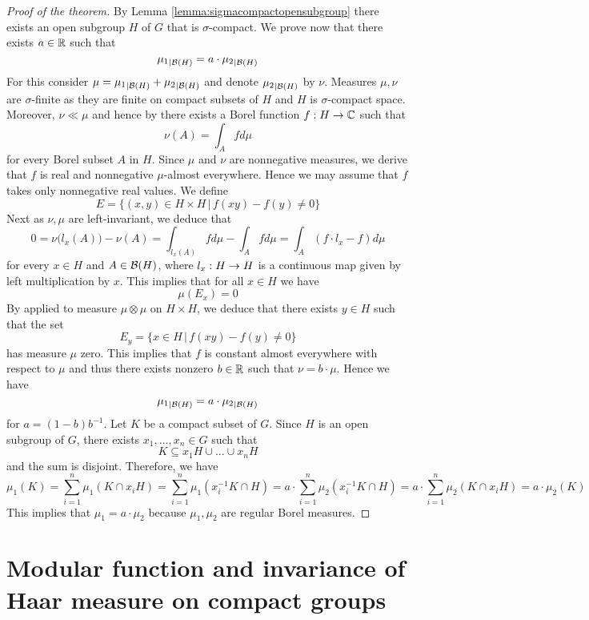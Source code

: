 \begin{proof}[Proof of the theorem]
By Lemma \ref{lemma:sigmacompactopensubgroup} there exists an open subgroup $H$ of $G$ that is $\sigma$-compact. We prove now that there exists $a\in {\mathbb R}$ such that
$${\mu_1}_{\mid {\mathcal B}(H)} = a\cdot {\mu_2}_{\mid {\mathcal B}(H)}$$
For this consider $\mu = {\mu_1}_{\mid {\mathcal B}(H)} + {\mu_2}_{\mid {\mathcal B}(H)}$ and denote ${\mu_2}_{\mid {\mathcal B}(H)}$ by $\nu$. Measures $\mu, \nu$ are $\sigma$-finite as they are finite on compact subsets of $H$ and $H$ is $\sigma$-compact space. Moreover, $\nu \ll \mu$ and hence by {\cite[Theorem 5.3]{Radon_Nikodym_Hahn_Jordan_Lebesgue_decomposition}} there exists a Borel function $f:H\rightarrow {\mathbb C}$ such that
$$\nu(A) = \int_Afd\mu$$
for every Borel subset $A$ in $H$. Since $\mu$ and $\nu$ are nonnegative measures, we derive that $f$ is real and nonnegative $\mu$-almost everywhere. Hence we may assume that $f$ takes only nonnegative real values. We define
$$E = \big\{(x,y)\in H\times H\,\big|\,f(xy) - f(y) \neq 0\big\}$$
Next as $\nu, \mu$ are left-invariant, we deduce that 
$$0 = \nu\big(l_x(A)\big) - \nu(A) = \int_{l_x(A)}fd\mu -\int_{A}fd\mu = \int_{A}\left(f\cdot l_x - f\right)d\mu$$
for every $x\in H$ and $A\in {\mathcal B}(H)$, where $l_x:H\rightarrow H$ is a continuous map given by left multiplication by $x$. This implies that for all $x\in H$ we have
$$\mu(E_x) = 0$$
By {\cite[Theorem 7.5]{Integration}} applied to measure $\mu\otimes \mu$ on $H\times H$, we deduce that there exists $y\in H$ such that the set
$$E_y = \big\{x\in H\,\big|\,f(xy) -f(y) \neq 0\big\}$$
has measure $\mu$ zero. This implies that $f$ is constant almost everywhere with respect to $\mu$ and thus there exists nonzero $b\in {\mathbb R}$ such that $\nu = b\cdot \mu$. Hence we have
$${\mu_1}_{\mid {\mathcal B}(H)} = a\cdot {\mu_2}_{\mid {\mathcal B}(H)}$$
for $a = (1-b)b^{-1}$. Let $K$ be a compact subset of $G$. Since $H$ is an open subgroup of $G$, there exists $x_1,...,x_n\in G$ such that
$$K\subseteq x_1H\cup ...\cup x_nH$$
and the sum is disjoint. Therefore, we have
$$\mu_1(K) = \sum_{i=1}^n\mu_1\left(K\cap x_iH\right) = \sum_{i=1}^n\mu_1\left(x_i^{-1}K\cap H\right) =a\cdot \sum_{i=1}^n\mu_2\left(x_i^{-1}K\cap H\right) = a\cdot \sum_{i=1}^n\mu_2\left(K\cap x_iH\right) = a\cdot \mu_2(K)$$
This implies that $\mu_1 = a\cdot \mu_2$ because $\mu_1,\mu_2$ are regular Borel measures.
\end{proof}

\section{Modular function and invariance of Haar measure on compact groups}






\small



